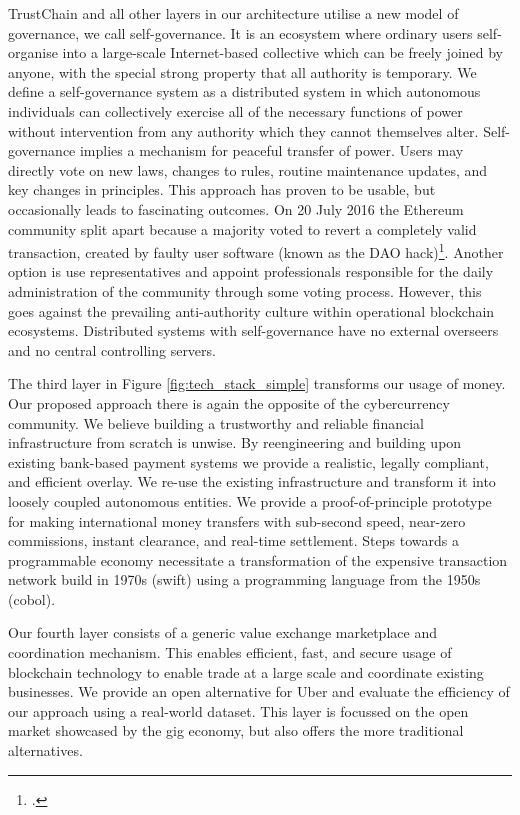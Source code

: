 \documentclass[USenglish]{article}
\begin{document}
TrustChain and all other layers in our architecture utilise a new model of governance, we call self-governance.
It is an ecosystem where ordinary users self-organise into a large-scale Internet-based collective which can be freely joined by anyone, with the special strong property that all authority is temporary.
We define a self-governance system as a distributed system in which autonomous individuals can collectively exercise all of the necessary functions of power without intervention from any authority which they cannot themselves alter.
Self-governance implies a mechanism for peaceful transfer of power. 
Users may directly vote on new laws, changes to rules, routine maintenance updates, and key changes in principles. 
This approach has proven to be usable, but occasionally leads to fascinating outcomes.
On 20 July 2016 the Ethereum community split apart because a majority voted to revert a completely valid transaction, created by faulty user software (known as the DAO hack)\footcite{cryptocomparedao}.
Another option is use representatives and appoint professionals responsible for the daily administration of the community through some voting process.
However, this goes against the prevailing anti-authority culture within operational blockchain ecosystems.
Distributed systems with self-governance have no external overseers and no central controlling servers.

The third layer in Figure \ref{fig:tech_stack_simple} transforms our usage of money.
Our proposed approach there is again the opposite of the cybercurrency community.
We believe building a trustworthy and reliable financial infrastructure from scratch is unwise.
By reengineering and building upon existing bank-based payment systems we provide a realistic, legally compliant, and efficient overlay.
We re-use the existing infrastructure and transform it into loosely coupled autonomous entities.
We provide a proof-of-principle prototype for making international money transfers with sub-second speed, near-zero commissions, instant clearance, and real-time settlement. 
Steps towards a programmable economy necessitate a transformation of the expensive transaction network build in 1970s (swift) using a programming language from the 1950s (cobol).

Our fourth layer consists of a generic value exchange marketplace and coordination mechanism.
This enables efficient, fast, and secure usage of blockchain technology to enable trade at a large scale and coordinate existing businesses.
We provide an open alternative for Uber and evaluate the efficiency of our approach using a real-world dataset.
This layer is focussed on the open market showcased by the gig economy, but also offers the more traditional alternatives.
\end{document}
